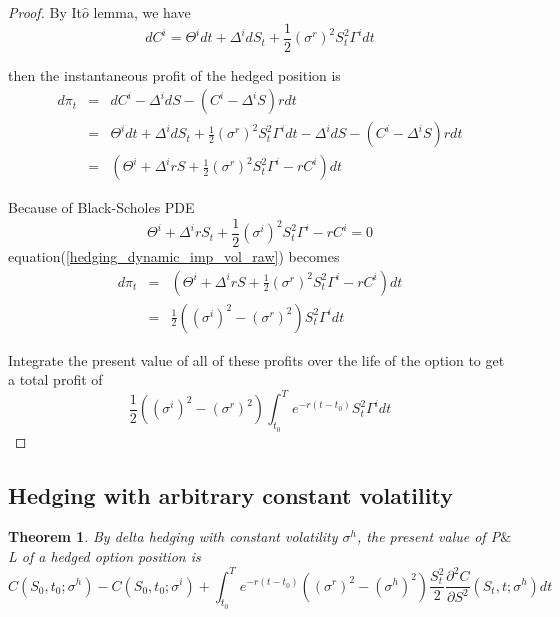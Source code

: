 \documentclass[10pt]{article}
\theoremstyle{plain}
\newtheorem{theorem}{Theorem}[section]
\numberwithin{equation}{section}
\numberwithin{table}{section}
\newcommand{\s}{\sigma}
\newcommand{\prt}[1]{\left( #1 \right)}  %
\newcommand{\pa}{\partial}
\begin{document}
\begin{proof}
    By It$\hat{o}$ lemma, we have 
    \[
        dC^i =  \Theta^i dt+ \Delta^i dS_t + \frac{1}{2}(\s^r)^2 S^2_t \Gamma^i dt    
    \]

    then the instantaneous profit of the hedged position is
    \begin{eqnarray}
        d\pi_t &=& dC^i - \Delta^i dS - (C^i -\Delta^i S)rdt  \nonumber \\
        &=&  \Theta^i dt+ \Delta^i dS_t + \frac{1}{2}(\s^r)^2 S^2_t \Gamma^i dt  - \Delta^i dS - (C^i -\Delta^i S)rdt \nonumber \\
        &=&  \prt{ \Theta^i + \Delta^i rS + \frac{1}{2}(\s^r)^2 S^2_t \Gamma^i -  rC^i }dt 
        \label{hedging_dynamic_imp_vol_raw}
    \end{eqnarray}

    Because of Black-Scholes PDE
    \[
        \Theta^i + \Delta^i r S_t + \frac{1}{2}(\s^i)^2 S^2_t \Gamma^i - rC^i = 0
    \]
    equation(\ref{hedging_dynamic_imp_vol_raw}) becomes
    \begin{eqnarray*}
        d\pi_t &=& \prt{ \Theta^i + \Delta^i rS + \frac{1}{2}(\s^r)^2 S^2_t \Gamma^i -  rC^i }dt \\
            &=& \frac{1}{2}\prt{(\s^i)^2 - (\s^r)^2 } S^2_t \Gamma^i dt
    \end{eqnarray*}

    Integrate the present value of all of these profits over the life of the
    option to get a total profit of
    \[
        \frac{1}{2}\prt{(\s^i)^2 - (\s^r)^2 }  \int_{t_0}^T e^{-r(t-t_0)}  S^2_t \Gamma^i dt
    \]
    

\end{proof}



\subsection{Hedging with arbitrary constant volatility}

\begin{theorem}
    By delta hedging with constant volatility $\s^h$, the present value of P$\&$L of a hedged option position is 
    \[
        C(S_0,t_0;\s^h)-C(S_0,t_0;\s^i) + \int_{t_0}^T e^{-r(t-t_0)}((\s^r)^2-(\s^h)^2)\frac{S_t^2}{2}\frac{\pa^2 C}{\pa S^2}(S_t,t;\s^h) dt    
    \]
\end{theorem}
\end{document}
